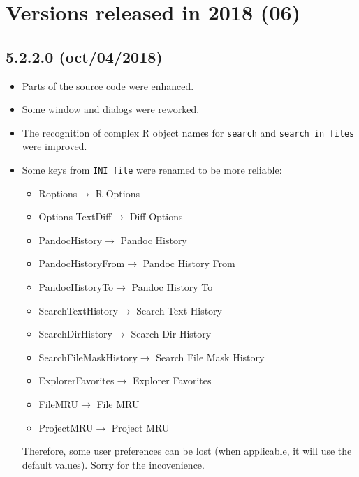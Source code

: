 
\hypertarget{2018}{}
\section{Versions released in 2018 (06)}

\subsection*{5.2.2.0 (oct/04/2018)}
\begin{itemize}
  \item Parts of the source code were enhanced.
  \item Some window and dialogs were reworked.
  \item The recognition of complex R object names for \texttt{search} and \texttt{search in files} were improved.
  \item Some keys from \texttt{INI file} were renamed to be more reliable:
    \begin{itemize} 
      \item \lbrack Roptions\rbrack $\to$ \lbrack R Options\rbrack
      \item \lbrack Options TextDiff\rbrack $\to$ \lbrack Diff Options\rbrack
      \item \lbrack PandocHistory\rbrack $\to$ \lbrack Pandoc History\rbrack
      \item \lbrack PandocHistoryFrom\rbrack $\to$ \lbrack Pandoc History From\rbrack
      \item \lbrack PandocHistoryTo\rbrack $\to$ \lbrack Pandoc History To\rbrack
      \item \lbrack SearchTextHistory\rbrack $\to$ \lbrack Search Text History\rbrack
      \item \lbrack SearchDirHistory\rbrack $\to$ \lbrack Search Dir History\rbrack
      \item \lbrack SearchFileMaskHistory\rbrack $\to$ \lbrack Search File Mask History\rbrack
      \item \lbrack ExplorerFavorites\rbrack $\to$ \lbrack Explorer Favorites\rbrack
      \item \lbrack FileMRU\rbrack $\to$ \lbrack File MRU\rbrack
      \item \lbrack ProjectMRU\rbrack $\to$ \lbrack Project MRU\rbrack
    \end{itemize}
    Therefore, some user preferences can be lost (when applicable, it will use the default values). Sorry for the incovenience.
\end{itemize}

